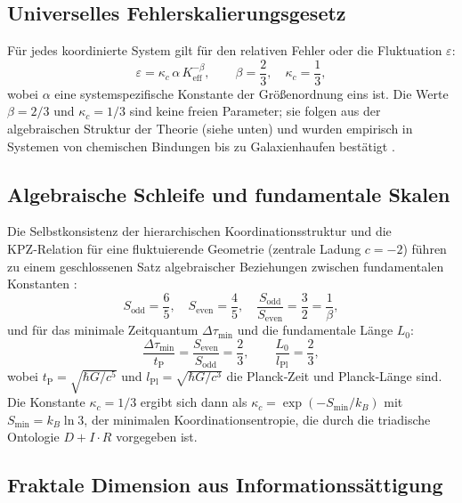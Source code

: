 \documentclass[11pt,a4paper]{article}
\newcommand{\kappac}{\kappa_c}
\newcommand{\Keff}{K_{\mathrm{eff}}}
\newcommand{\betaf}{\beta}
\newcommand{\Lpl}{l_{\mathrm{Pl}}}
\newcommand{\tP}{t_{\mathrm{P}}}
\newcommand{\Sodd}{S_{\mathrm{odd}}}
\newcommand{\Seven}{S_{\mathrm{even}}}
\newcommand{\Dtau}{\Delta\tau_{\min}}
\newcommand{\Lzero}{L_0}
\begin{document}
	\subsection{Universelles Fehlerskalierungsgesetz}
	
	Für jedes koordinierte System gilt für den relativen Fehler oder die Fluktuation \(\varepsilon\):
	\begin{equation}
		\varepsilon = \kappac \, \alpha \, \Keff^{-\betaf}, \qquad \betaf = \frac{2}{3}, \quad \kappac = \frac{1}{3},
		\label{eq:universal}
	\end{equation}
	wobei \(\alpha\) eine systemspezifische Konstante der Größenordnung eins ist. Die Werte \(\betaf = 2/3\) und \(\kappac = 1/3\) sind keine freien Parameter; sie folgen aus der algebraischen Struktur der Theorie (siehe unten) und wurden empirisch in Systemen von chemischen Bindungen bis zu Galaxienhaufen bestätigt \cite{AppendixL}.
	
	\subsection{Algebraische Schleife und fundamentale Skalen}
	
	Die Selbstkonsistenz der hierarchischen Koordinationsstruktur und die KPZ‑Relation für eine fluktuierende Geometrie (zentrale Ladung \(c=-2\)) führen zu einem geschlossenen Satz algebraischer Beziehungen zwischen fundamentalen Konstanten \cite{AppendixY}:
	\begin{equation}
		\Sodd = \frac{6}{5},\quad \Seven = \frac{4}{5},\quad \frac{\Sodd}{\Seven} = \frac{3}{2} = \frac{1}{\betaf},
	\end{equation}
	und für das minimale Zeitquantum \(\Dtau\) und die fundamentale Länge \(\Lzero\):
	\begin{equation}
		\frac{\Dtau}{\tP} = \frac{\Seven}{\Sodd} = \frac{2}{3}, \qquad \frac{\Lzero}{\Lpl} = \frac{2}{3},
		\label{eq:algebraic-loop}
	\end{equation}
	wobei \(\tP = \sqrt{\hbar G / c^5}\) und \(\Lpl = \sqrt{\hbar G / c^3}\) die Planck‑Zeit und Planck‑Länge sind. Die Konstante \(\kappac = 1/3\) ergibt sich dann als \(\kappac = \exp(-S_{\min}/k_B)\) mit \(S_{\min} = k_B \ln 3\), der minimalen Koordinationsentropie, die durch die triadische Ontologie \(D + I \cdot R\) vorgegeben ist.
	
	\subsection{Fraktale Dimension aus Informationssättigung}
	
\end{document}

